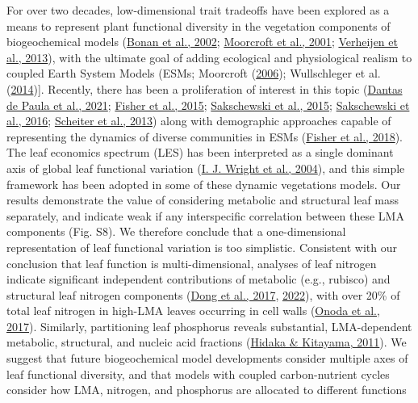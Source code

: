 \documentclass[
  12pt,
  letterpaper,
  DIV=11,
  numbers=noendperiod]{scrartcl}
\begin{document}
For over two decades, low-dimensional trait tradeoffs have been explored
as a means to represent plant functional diversity in the vegetation
components of biogeochemical models
(\protect\hyperlink{ref-Bonan2002}{Bonan et al., 2002};
\protect\hyperlink{ref-Moorcroft2001}{Moorcroft et al., 2001};
\protect\hyperlink{ref-Verheijen2013}{Verheijen et al., 2013}), with the
ultimate goal of adding ecological and physiological realism to coupled
Earth System Models (ESMs; Moorcroft
(\protect\hyperlink{ref-Moorcroft2006}{2006}); Wullschleger et al.
(\protect\hyperlink{ref-Wullschleger2014}{2014}){]}. Recently, there has
been a proliferation of interest in this topic
(\protect\hyperlink{ref-DantasdePaula2021}{Dantas de Paula et al.,
2021}; \protect\hyperlink{ref-Fisher2015}{Fisher et al., 2015};
\protect\hyperlink{ref-Sakschewski2015}{Sakschewski et al., 2015};
\protect\hyperlink{ref-Sakschewski2016}{Sakschewski et al., 2016};
\protect\hyperlink{ref-Scheiter2013}{Scheiter et al., 2013}) along with
demographic approaches capable of representing the dynamics of diverse
communities in ESMs (\protect\hyperlink{ref-Fisher2018}{Fisher et al.,
2018}). The leaf economics spectrum (LES) has been interpreted as a
single dominant axis of global leaf functional variation
(\protect\hyperlink{ref-Wright2004a}{I. J. Wright et al., 2004}), and
this simple framework has been adopted in some of these dynamic
vegetations models. Our results demonstrate the value of considering
metabolic and structural leaf mass separately, and indicate weak if any
interspecific correlation between these LMA components (Fig. S8). We
therefore conclude that a one-dimensional representation of leaf
functional variation is too simplistic. Consistent with our conclusion
that leaf function is multi-dimensional, analyses of leaf nitrogen
indicate significant independent contributions of metabolic (e.g.,
rubisco) and structural leaf nitrogen components
(\protect\hyperlink{ref-Dong2017}{Dong et al., 2017},
\protect\hyperlink{ref-Dong2022a}{2022}), with over 20\% of total leaf
nitrogen in high-LMA leaves occurring in cell walls
(\protect\hyperlink{ref-Onoda2017}{Onoda et al., 2017}). Similarly,
partitioning leaf phosphorus reveals substantial, LMA-dependent
metabolic, structural, and nucleic acid fractions
(\protect\hyperlink{ref-Hidaka2011}{Hidaka \& Kitayama, 2011}). We
suggest that future biogeochemical model developments consider multiple
axes of leaf functional diversity, and that models with coupled
carbon-nutrient cycles consider how LMA, nitrogen, and phosphorus are
allocated to different functions
\end{document}
